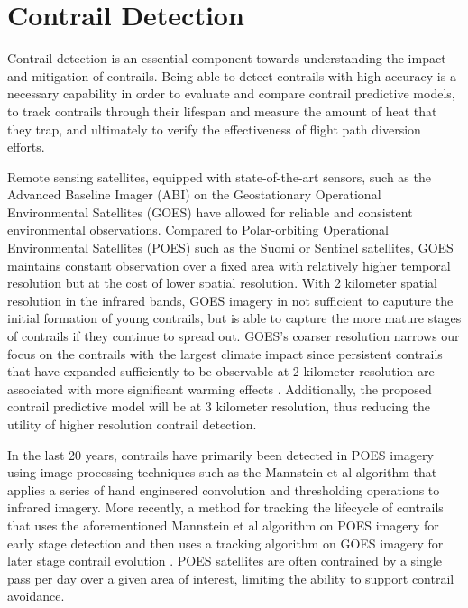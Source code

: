 \section{Contrail Detection}
\label{sec:intro}

Contrail detection is an essential component towards understanding the impact and mitigation of contrails. Being able to detect contrails with high accuracy is a necessary capability in order to evaluate and compare contrail predictive models, to track contrails through their lifespan and measure the amount of heat that they trap, and ultimately to verify the effectiveness of flight path diversion efforts.

Remote sensing satellites, equipped with state-of-the-art sensors, such as the Advanced Baseline Imager (ABI) on the Geostationary Operational Environmental Satellites (GOES) \cite{goes} have allowed for reliable and consistent environmental observations. Compared to Polar-orbiting Operational Environmental Satellites (POES) such as the Suomi or Sentinel satellites, GOES maintains constant observation over a fixed area with relatively higher temporal resolution but at the cost of lower spatial resolution. With 2 kilometer spatial resolution in the infrared bands, GOES imagery in not sufficient to caputure the initial formation of young contrails, but is able to capture the more mature stages of contrails if they continue to spread out. GOES's coarser resolution narrows our focus on the contrails with the largest climate impact since persistent contrails that have expanded sufficiently to be observable at 2 kilometer resolution are associated with more significant warming effects \cite{warm, persist}. Additionally, the proposed contrail predictive model will be at 3 kilometer resolution, thus reducing the utility of higher resolution contrail detection. 

In the last 20 years, contrails have primarily been detected in POES imagery using image processing techniques such as the Mannstein et al algorithm \cite{mannstein} that applies a series of hand engineered convolution and thresholding operations to infrared imagery. More recently, a method for tracking the lifecycle of contrails that uses the aforementioned Mannstein et al algorithm on POES imagery for early stage detection and then uses a tracking algorithm on GOES imagery for later stage contrail evolution \cite{track}. POES satellites are often contrained by a single pass per day over a given area of interest, limiting the ability to support contrail avoidance.

